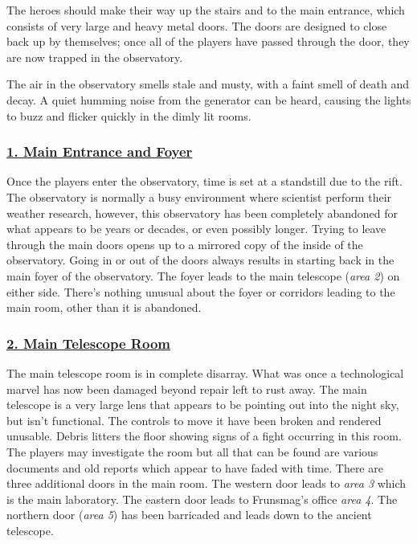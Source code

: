 \documentclass{article}
\begin{document}
\begin{multicols*}{2}
	The heroes should make their way up the stairs and to the main entrance, which consists of very large and heavy metal doors. The doors are designed to close back up by themselves; once all of the players have passed through the door, they are now trapped in the observatory. 
	
	The air in the observatory smells stale and musty, with a faint smell of death and decay. A quiet humming noise from the generator can be heard, causing the lights to buzz and flicker quickly in the dimly lit rooms.
	

	\subsubsection*{\underline{1. Main Entrance and Foyer}}

	Once the players enter the observatory, time is set at a standstill due to the rift. The observatory is normally a busy environment where scientist perform their weather research, however, this observatory has been completely abandoned for what appears to be years or decades, or even possibly longer. Trying to leave through the main doors opens up to a mirrored copy of the inside of the observatory. Going in or out of the doors always results in starting back in the main foyer of the observatory. The foyer leads to the main telescope (\emph{area 2}) on either side. There's nothing unusual about the foyer or corridors leading to the main room, other than it is abandoned. 
	
	\subsubsection*{\underline{2. Main Telescope Room}}
	The main telescope room is in complete disarray. What was once a technological marvel has now been damaged beyond repair left to rust away. The main telescope is a very large lens that appears to be pointing out into the night sky, but isn't functional. The controls to move it have been broken and rendered unusable. Debris litters the floor showing signs of a fight occurring in this room. The players may investigate the room but all that can be found are various documents and old reports which appear to have faded with time. There are three additional doors in the main room. The western door leads to \emph{area 3} which is the main laboratory. The eastern door leads to Frunsmag's office \emph{area 4}. The northern door (\emph{area 5}) has been barricaded and leads down to the ancient telescope.
	

\end{multicols*}
\end{document}
